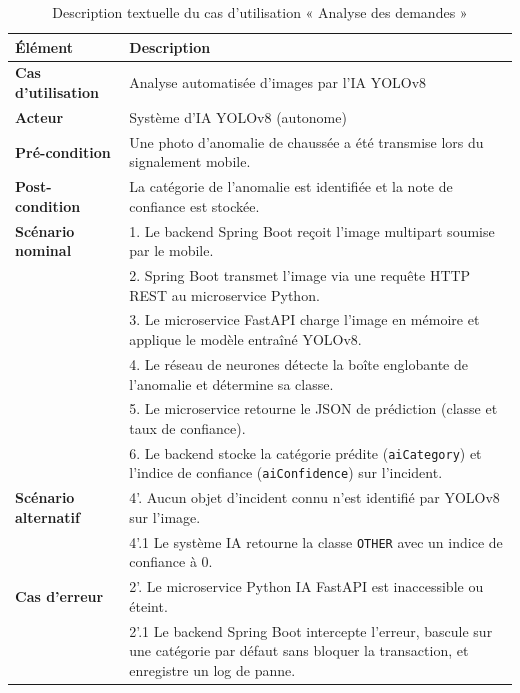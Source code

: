 \begin{table}[H]
    \centering
    \caption{Description textuelle du cas d'utilisation « Analyse des demandes »}
    \label{tab:txt_analyse_yolo}
    \vspace{0.2cm}
    \small
    \begin{tabularx}{\textwidth}{|l|X|}
        \hline
        \textbf{Élément} & \textbf{Description} \\ \hline
        \textbf{Cas d’utilisation} & Analyse automatisée d'images par l'IA YOLOv8 \\ \hline
        \textbf{Acteur} & Système d'IA YOLOv8 (autonome) \\ \hline
        \textbf{Pré-condition} & Une photo d'anomalie de chaussée a été transmise lors du signalement mobile. \\ \hline
        \textbf{Post-condition} & La catégorie de l'anomalie est identifiée et la note de confiance est stockée. \\ \hline
        \textbf{Scénario nominal} &
        1. Le backend Spring Boot reçoit l'image multipart soumise par le mobile.\\
        & 2. Spring Boot transmet l'image via une requête HTTP REST au microservice Python.\\
        & 3. Le microservice FastAPI charge l'image en mémoire et applique le modèle entraîné YOLOv8.\\
        & 4. Le réseau de neurones détecte la boîte englobante de l'anomalie et détermine sa classe.\\
        & 5. Le microservice retourne le JSON de prédiction (classe et taux de confiance).\\
        & 6. Le backend stocke la catégorie prédite (\texttt{aiCategory}) et l'indice de confiance (\texttt{aiConfidence}) sur l'incident. \\ \hline
        \textbf{Scénario alternatif} &
        4'. Aucun objet d'incident connu n'est identifié par YOLOv8 sur l'image.\\
        & 4'.1 Le système IA retourne la classe \texttt{OTHER} avec un indice de confiance à 0. \\ \hline
        \textbf{Cas d’erreur} &
        2'. Le microservice Python IA FastAPI est inaccessible ou éteint.\\
        & 2'.1 Le backend Spring Boot intercepte l'erreur, bascule sur une catégorie par défaut sans bloquer la transaction, et enregistre un log de panne. \\ \hline
    \end{tabularx}
\end{table}

